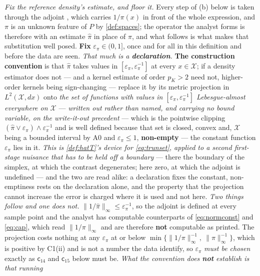 \begin{definition}
\emph{Fix the reference density's estimate, and floor it.} Every step of \textup{(b)} below is taken
through the adjoint , which carries $1/\pi(x)$ in front of the whole expression, and
$\pi$ is an unknown feature of $P$ by \cref{def:spaces}; the operator the analyst forms is therefore
 with an estimate $\hat\pi$ in place of $\pi$, and what follows is what makes that
substitution well posed. \textbf{Fix} $\varepsilon_\pi\in(0,1]$, once and for all in this definition and
before the data are seen. \emph{That much is a \textbf{declaration}.} \textbf{The construction
convention} is that $\hat\pi$ takes values in $[\varepsilon_\pi,\varepsilon_\pi^{-1}]$ at every
$x\in\mathcal X$; if a density estimator does not --- and a kernel estimate of order $p_K>2$ need not,
higher-order kernels being sign-changing --- replace it by its metric projection in
$L^{2}(\mathcal X,dx)$ onto \emph{the set of functions with values in
$[\varepsilon_\pi,\varepsilon_\pi^{-1}]$ Lebesgue-almost everywhere on $\mathcal X$} --- \emph{written
out rather than named, and carrying no bound variable, on the write-it-out precedent} --- which is the
pointwise clipping $(\hat\pi\vee\varepsilon_\pi)\wedge\varepsilon_\pi^{-1}$ and is well
defined because that set is closed, convex and, $\mathcal X$ being a bounded interval by A0 and
$\varepsilon_\pi\le1$, \textbf{non-empty} --- the constant function $\varepsilon_\pi$ lies in it.
\emph{This is \cref{def:hatT}'s device for \eqref{eq:trunset}, applied to a second first-stage nuisance
that has to be held off a boundary} --- there the boundary of the simplex, at which the contrast
degenerates; here zero, at which the adjoint is undefined --- and the two are read alike: a declaration
fixes the constant, non-emptiness rests on the
declaration alone, and the property that the projection cannot increase the error is charged where it is
used and not here. \emph{Two things follow and one does not.} $\|1/\hat\pi\|_\infty\le\varepsilon_\pi^{-1}$,
so the adjoint is defined at every sample point and the analyst has computable counterparts of
\eqref{eq:normconst} and \eqref{eq:cap}, which read $\|1/\pi\|_\infty$ and are therefore \textbf{not}
computable as printed. The projection costs nothing at any $\varepsilon_\pi$ at or below
$\min\big\{\|1/\pi\|_\infty^{-1},\ \|\pi\|_\infty^{-1}\big\}$, which is positive by C1(ii) and is not a
number the data identify, so $\varepsilon_\pi$ \emph{must be chosen} exactly as $\mathsf c_{14}$ and
$\mathsf c_{15}$ below must be. \emph{What the convention does \textbf{not} establish is that running
}
\end{definition}
